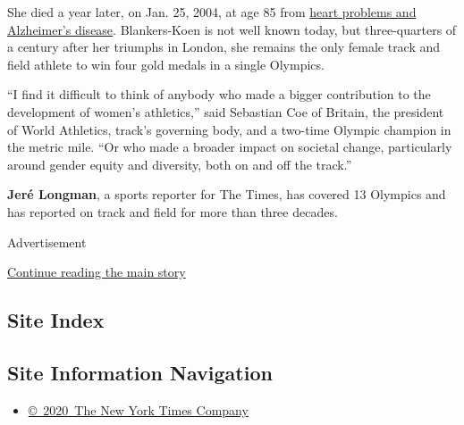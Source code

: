 She died a year later, on Jan. 25, 2004, at age 85 from
\href{https://www.nytimes.com/2004/01/26/sports/fanny-blankers-koen-star-of-48-olympics-dies-at-85.html}{heart
problems and Alzheimer's disease}. Blankers-Koen is not well known
today, but three-quarters of a century after her triumphs in London, she
remains the only female track and field athlete to win four gold medals
in a single Olympics.

``I find it difficult to think of anybody who made a bigger contribution
to the development of women's athletics,'' said Sebastian Coe of
Britain, the president of World Athletics, track's governing body, and a
two-time Olympic champion in the metric mile. ``Or who made a broader
impact on societal change, particularly around gender equity and
diversity, both on and off the track.''

\textbf{Jeré Longman}, a sports reporter for The Times, has covered 13
Olympics and has reported on track and field for more than three
decades.

Advertisement

\protect\hyperlink{after-bottom}{Continue reading the main story}

\hypertarget{site-index}{%
\subsection{Site Index}\label{site-index}}

\hypertarget{site-information-navigation}{%
\subsection{Site Information
Navigation}\label{site-information-navigation}}

\begin{itemize}
\tightlist
\item
  \href{https://help.nytimes.com/hc/en-us/articles/115014792127-Copyright-notice}{©~2020~The
  New York Times Company}
\end{itemize}

